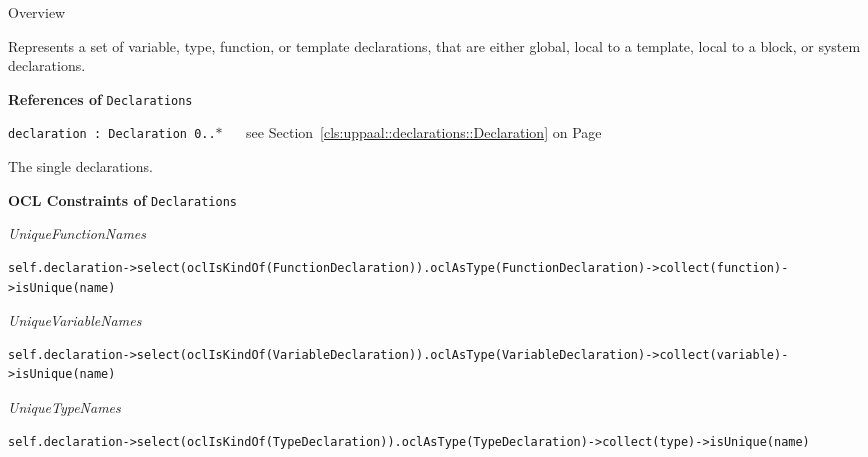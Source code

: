 	\begin{longdescription}
		\item[Overview] 		
				

	

		Represents a set of variable, type, function, or template declarations, that are either global, local to a template, local to a block, or system declarations.		
		
	
			\item[\textbf{References of} \texttt{Declarations}] ~
			\begin{longdescription}
	\item[\texttt{declaration : Declaration 	\symbol{"5B}0..$*$\symbol{"5D}
}] ~
	see Section~\ref{cls:uppaal::declarations::Declaration} on Page~\pageref{cls:uppaal::declarations::Declaration}
	
	\nopagebreak
		
				

	

		The single declarations.		
			\end{longdescription}
			\item[\textbf{OCL Constraints of} \texttt{Declarations}] ~
			\begin{longdescription}
	\item[\small\textit{UniqueFunctionNames}] ~ 
	\nopagebreak
	
		\begin{lstlisting}[breaklines=true]
self.declaration->select(oclIsKindOf(FunctionDeclaration)).oclAsType(FunctionDeclaration)->collect(function)->isUnique(name)		\end{lstlisting}
	\item[\small\textit{UniqueVariableNames}] ~ 
	\nopagebreak
	
		\begin{lstlisting}[breaklines=true]
self.declaration->select(oclIsKindOf(VariableDeclaration)).oclAsType(VariableDeclaration)->collect(variable)->isUnique(name)		\end{lstlisting}
	\item[\small\textit{UniqueTypeNames}] ~ 
	\nopagebreak
	
		\begin{lstlisting}[breaklines=true]
self.declaration->select(oclIsKindOf(TypeDeclaration)).oclAsType(TypeDeclaration)->collect(type)->isUnique(name)		\end{lstlisting}
			\end{longdescription}
	
	\end{longdescription}
	

